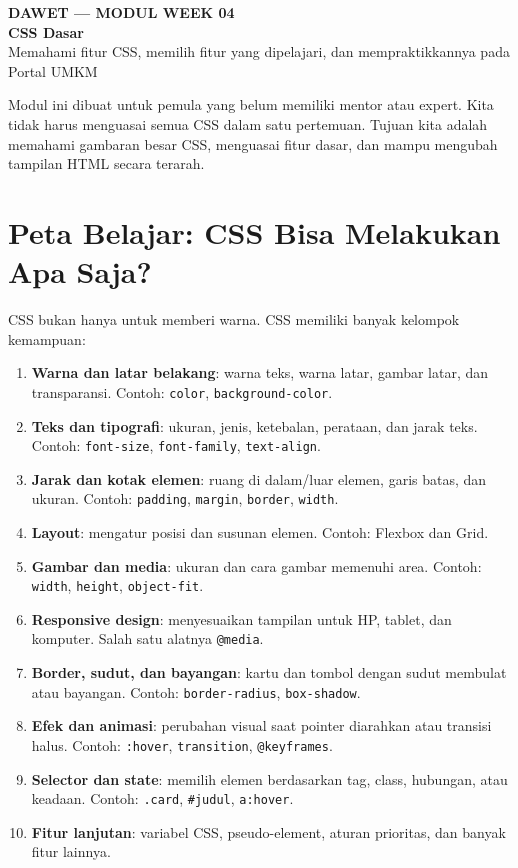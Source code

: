 \documentclass[11pt,a4paper]{article}
\begin{document}
\begin{center}
{\Large\bfseries DAWET --- MODUL WEEK 04}\\[5pt]
{\huge\bfseries CSS Dasar}\\[5pt]
{\large Memahami fitur CSS, memilih fitur yang dipelajari, dan mempraktikkannya pada Portal UMKM}
\end{center}

\begin{ingat}
Modul ini dibuat untuk pemula yang belum memiliki mentor atau expert. Kita tidak harus menguasai semua CSS dalam satu pertemuan. Tujuan kita adalah memahami gambaran besar CSS, menguasai fitur dasar, dan mampu mengubah tampilan HTML secara terarah.
\end{ingat}
\tableofcontents
\newpage

\section{Peta Belajar: CSS Bisa Melakukan Apa Saja?}
CSS bukan hanya untuk memberi warna. CSS memiliki banyak kelompok kemampuan:

\begin{enumerate}[leftmargin=*]
\item \textbf{Warna dan latar belakang}: warna teks, warna latar, gambar latar, dan transparansi. Contoh: \texttt{color}, \texttt{background-color}.
\item \textbf{Teks dan tipografi}: ukuran, jenis, ketebalan, perataan, dan jarak teks. Contoh: \texttt{font-size}, \texttt{font-family}, \texttt{text-align}.
\item \textbf{Jarak dan kotak elemen}: ruang di dalam/luar elemen, garis batas, dan ukuran. Contoh: \texttt{padding}, \texttt{margin}, \texttt{border}, \texttt{width}.
\item \textbf{Layout}: mengatur posisi dan susunan elemen. Contoh: Flexbox dan Grid.
\item \textbf{Gambar dan media}: ukuran dan cara gambar memenuhi area. Contoh: \texttt{width}, \texttt{height}, \texttt{object-fit}.
\item \textbf{Responsive design}: menyesuaikan tampilan untuk HP, tablet, dan komputer. Salah satu alatnya \texttt{@media}.
\item \textbf{Border, sudut, dan bayangan}: kartu dan tombol dengan sudut membulat atau bayangan. Contoh: \texttt{border-radius}, \texttt{box-shadow}.
\item \textbf{Efek dan animasi}: perubahan visual saat pointer diarahkan atau transisi halus. Contoh: \texttt{:hover}, \texttt{transition}, \texttt{@keyframes}.
\item \textbf{Selector dan state}: memilih elemen berdasarkan tag, class, hubungan, atau keadaan. Contoh: \texttt{.card}, \texttt{\#judul}, \texttt{a:hover}.
\item \textbf{Fitur lanjutan}: variabel CSS, pseudo-element, aturan prioritas, dan banyak fitur lainnya.
\end{enumerate}
\end{document}
